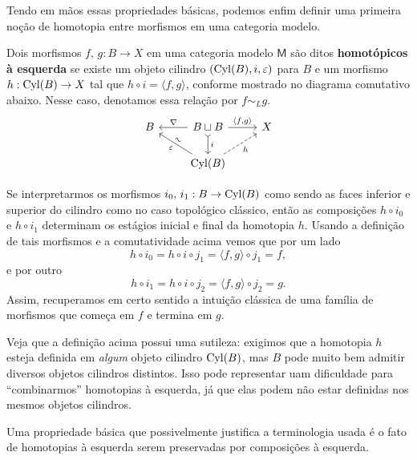 Tendo em mãos essas propriedades básicas, podemos enfim definir uma primeira noção de homotopia entre morfismos em uma categoria modelo.

\begin{defin}
  Dois morfismos $f,\,g: B \to X$ em uma categoria modelo $\mathsf{M}$ são ditos \textbf{homotópicos à esquerda} se existe um objeto cilindro $(\mathrm{Cyl}(B),i,\varepsilon)$ para $B$ e um morfismo $h: \mathrm{Cyl}(B) \to X$ tal que $h \circ i = \langle f,g \rangle$, conforme mostrado no diagrama comutativo abaixo.
  Nesse caso, denotamos essa relação por $f \sim_{L} g$.
  \begin{displaymath}
    \begin{tikzcd}
      B
      & B \sqcup B
      \arrow[l, "\nabla" swap]
      \arrow[r, "{\langle f,g \rangle}"]
      \arrow[d, tail, "i"]
      & X
      \\ & \Cyl(B)
      \arrow[ru, dashed, "h" swap]
      \arrow[lu, "\varepsilon", "\sim" {sloped}]
    \end{tikzcd}
  \end{displaymath}
\end{defin}

Se interpretarmos os morfismos $i_{0},\, i_{1}: B \to \mathrm{Cyl}(B)$ como sendo as faces inferior e superior do cilindro como no caso topológico clássico, então as composições $h \circ i_{0}$ e $h \circ i_{1}$ determinam os estágios inicial e final da homotopia $h$.
Usando a definição de tais morfismos e a comutatividade acima vemos que por um lado
\begin{displaymath}
  h \circ i_{0} = h \circ i \circ j_{1} = \langle f,g \rangle \circ j_{1} = f,
\end{displaymath}
e por outro
\begin{displaymath}
  h \circ i_{1} = h \circ i \circ j_{2} = \langle f,g \rangle \circ j_{2} = g.
\end{displaymath}
Assim, recuperamos em certo sentido a intuição clássica de uma família de morfismos que começa em $f$ e termina em $g$.

Veja que a definição acima possui uma sutileza: exigimos que a homotopia $h$ esteja definida em \emph{algum} objeto cilindro $\mathrm{Cyl}(B)$, mas $B$ pode muito bem admitir diversos objetos cilindros distintos.
Isso pode representar uam dificuldade para ``combinarmos'' homotopias à esquerda, já que elas podem não estar definidas nos mesmos objetos cilindros.

Uma propriedade básica que possivelmente justifica a terminologia usada é o fato de homotopias à esquerda serem preservadas por composições à esquerda.


